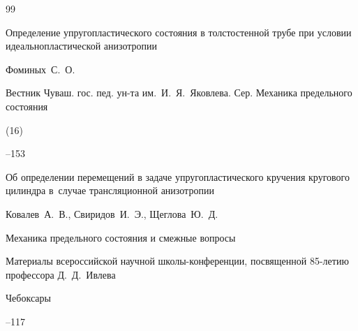 \begin{thebibliography}{99}

\paper Определение упругопластического состояния в толстостенной трубе при условии идеальнопластической анизотропии

\by Фоминых~С.~О.

\jour Вестник Чуваш. гос. пед. ун-та им.~И.~Я.~Яковлева. Сер. Механика предельного состояния


(16)

--153





\paper Об определении перемещений в задаче упругопластического кручения кругового цилиндра в~случае трансляционной анизотропии

\by Ковалев~А.~В., Свиридов~И.~Э., Щеглова~Ю.~Д.

\inbook Механика предельного состояния и смежные вопросы

\bookinfo Материалы всероссийской научной школы-конференции, посвященной 85-летию профессора Д.~Д.~Ивлева

\publaddr Чебоксары


--117




\end{thebibliography}



\renewcommand{\baselinestretch}{0.83}





\newpage







\makeentitle



\newpage





